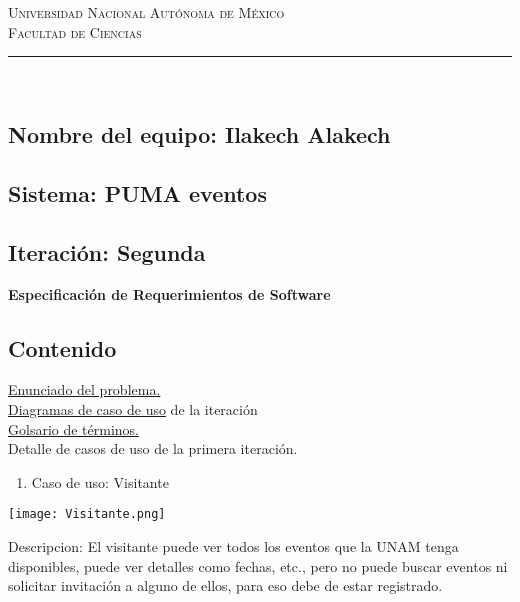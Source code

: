 \documentclass[12pt,letterpaper]{article}
\begin{document}
 

\begin{center}
  {\LARGE \scshape Universidad Nacional Aut\'onoma de M\'exico \vspace{10mm} \\ Facultad de Ciencias }
  \rule{0.8\textwidth}{.8pt}\\
\end{center}

\subsection*{Nombre del equipo: Ilakech Alakech}
\subsection*{Sistema: PUMA eventos} 
\subsection*{Iteraci\'on: Segunda} 

\begin{center}
  {\LARGE \textbf {Especificaci\'on de Requerimientos de Software}}
\end{center} 

\subsection*{Contenido}
\smallskip \underline{Enunciado del problema.}
\\ 
\smallskip \underline{Diagramas de caso de uso} de la iteraci\'on 
\\
\smallskip \underline{Golsario de t\'erminos.}
\\
\smallskip Detalle de casos de uso de la primera iteraci\'on.

\begin{enumerate}
\item Caso de uso: Visitante \\
\end{enumerate}

\begin{center}
  \texttt{[image: Visitante.png]}
\end{center}

Descripcion: El visitante puede ver todos los eventos que la UNAM tenga disponibles, puede ver detalles como fechas, etc., pero no puede buscar eventos ni solicitar invitaci\'on a alguno de ellos, para eso debe de estar registrado.
\end{document}
